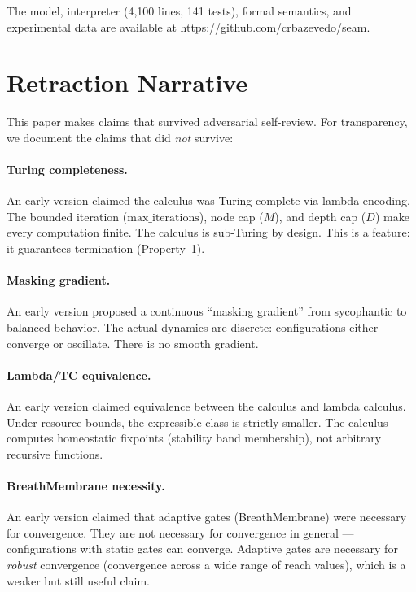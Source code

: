 \documentclass[sigconf,nonacm]{acmart}
\begin{document}
The model, interpreter (4,100 lines, 141 tests), formal semantics,
and experimental data are available at
\url{https://github.com/crbazevedo/seam}.


\appendix
\section{Retraction Narrative}

This paper makes claims that survived adversarial self-review. For
transparency, we document the claims that did \emph{not} survive:

\paragraph{Turing completeness.}
An early version claimed the calculus was Turing-complete via lambda
encoding. The bounded iteration ($\mathrm{max\_iterations}$), node cap
($M$), and depth cap ($D$) make every computation finite. The calculus
is sub-Turing by design. This is a feature: it guarantees termination
(Property~1).

\paragraph{Masking gradient.}
An early version proposed a continuous ``masking gradient'' from
sycophantic to balanced behavior. The actual dynamics are discrete:
configurations either converge or oscillate. There is no smooth gradient.

\paragraph{Lambda/TC equivalence.}
An early version claimed equivalence between the calculus and lambda
calculus. Under resource bounds, the expressible class is strictly smaller.
The calculus computes homeostatic fixpoints (stability band membership),
not arbitrary recursive functions.

\paragraph{BreathMembrane necessity.}
An early version claimed that adaptive gates (BreathMembrane) were
necessary for convergence. They are not necessary for convergence in
general --- configurations with static gates can converge. Adaptive gates
are necessary for \emph{robust} convergence (convergence across a wide
range of reach values), which is a weaker but still useful claim.




\end{document}
